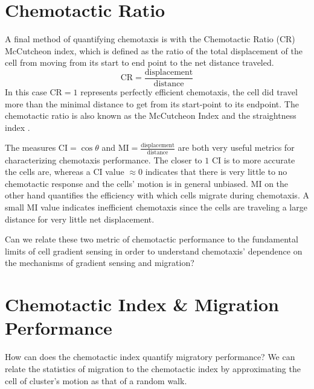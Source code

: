 \section{Chemotactic Ratio}

A final method of quantifying chemotaxis is with the Chemotactic Ratio (CR) McCutcheon index, which is defined as the ratio of the total displacement of the cell from moving from its start to end point to the net distance traveled.
\begin{equation}
    \text{CR} = \frac{\text{displacement}}{\text{distance}}
\end{equation}
In this case $\text{CR} = 1$ represents perfectly efficient chemotaxis, the cell did travel more than the minimal distance to get from its start-point to its endpoint. The chemotactic ratio is also known as the McCutcheon Index \cite{mccutcheon1946chemotaxis} and the straightness index \cite{codling2008random}.

The measures $\text{CI} = \cos\theta$ and $\text{MI} = \frac{\text{displacement}}{\text{distance}}$ are both very useful metrics for characterizing chemotaxis performance. The closer to $1$ CI is to more accurate the cells are, whereas a CI value $\approx 0$ indicates that there is very little to no chemotactic response and the cells' motion is in general unbiased. MI on the other hand quantifies the efficiency with which cells migrate during chemotaxis. A small MI value indicates inefficient chemotaxis since the cells are traveling a large distance for very little net displacement.

Can we relate these two metric of chemotactic performance to the fundamental limits of cell gradient sensing in order to understand chemotaxis' dependence on the mechanisms of gradient sensing and migration?


\section{Chemotactic Index \& Migration Performance}

How can does the chemotactic index quantify migratory performance? We can relate the statistics of migration to the chemotactic index by approximating the cell of cluster's motion as that of a random walk.

